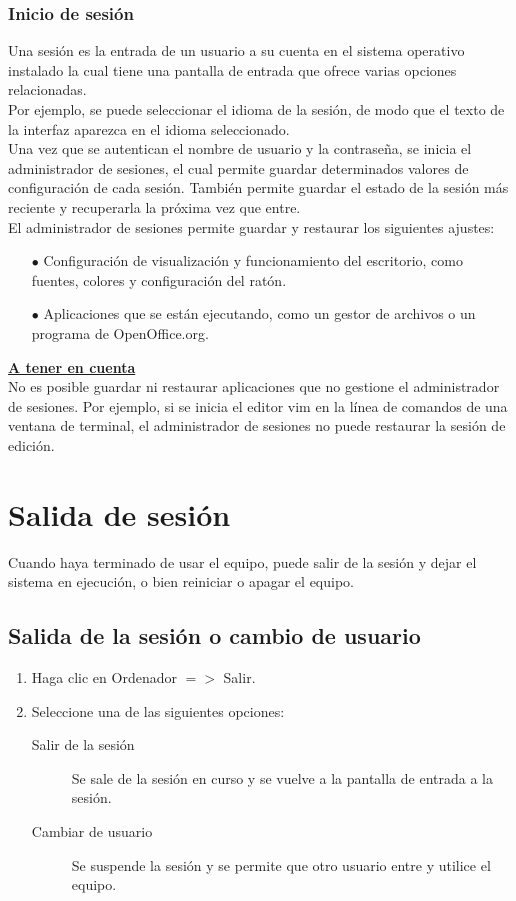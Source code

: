 \documentclass[12pt,letterpaper]{book}
\begin{document}
\subsubsection{Inicio de sesión}
Una sesión es la entrada de un usuario a su cuenta en el sistema operativo instalado la cual tiene una pantalla de entrada que ofrece varias opciones relacionadas.\\
Por ejemplo, se puede seleccionar el idioma de la sesión, de modo que el texto de la interfaz aparezca en el idioma seleccionado.\\
Una vez que se autentican el nombre de usuario y la contraseña, se inicia el administrador de sesiones, el cual permite guardar determinados valores de configuración de cada sesión. También permite guardar el estado de la sesión más reciente y recuperarla la próxima vez que entre.\\
El administrador de sesiones permite guardar y restaurar los siguientes ajustes:
\begin{itemize}
\item[$\bullet$] Configuración de visualización y funcionamiento del escritorio, como fuentes, colores y configuración del ratón.
\item[$\bullet$] Aplicaciones que se están ejecutando, como un gestor de archivos o un programa de OpenOffice.org.
\end{itemize}
{\bf \underline{A tener en cuenta}}\\
No es posible guardar ni restaurar aplicaciones que no gestione el administrador de sesiones. Por ejemplo, si se inicia el editor vim en la línea de comandos de una ventana de terminal, el administrador de sesiones no puede restaurar la sesión de edición.

\section{Salida de sesión}
Cuando haya terminado de usar el equipo, puede salir de la sesión y dejar el sistema en ejecución, o bien reiniciar o apagar el equipo.\\
\subsection{Salida de la sesión o cambio de usuario}
\begin{enumerate}
\item Haga clic en Ordenador $=>$ Salir.
\item Seleccione una de las siguientes opciones:
\begin{description}
\item[Salir de la sesión] Se sale de la sesión en curso y se vuelve a la pantalla de entrada a la sesión.
\item[Cambiar de usuario] Se suspende la sesión y se permite que otro usuario entre y utilice el equipo.
\end{description}
\end{enumerate}
\end{document}
